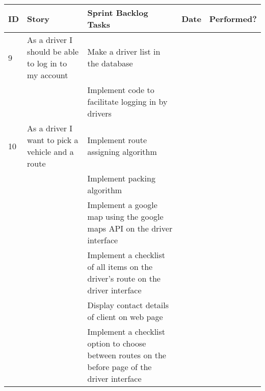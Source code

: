 \documentclass[paper=a4, fontsize=11pt]{scrartcl} %
\numberwithin{equation}{section} %
\numberwithin{figure}{section} %
\numberwithin{table}{section} %
\begin{document}
\begin{table}[]
\centering
\label{my-label}
\begin{tabular}{|p{1cm}|p{4cm}|p{4cm}|p{2cm}|p{2cm}|}
\hline
\textbf{ID} & \textbf{Story}                                                             & \textbf{Sprint Backlog Tasks}                                                                    & \textbf{Date} & \textbf{Performed?} \\ \hline
9           & As a driver I should be able to log in to my account                       & Make a driver list in the database                                                               &               &                     \\ \hline
            &                                                                            & Implement code to facilitate logging in by drivers                                               &               &                     \\ \hline
10          & As a driver I want to pick a vehicle and a route                           & Implement route assigning algorithm                                                              &               &                     \\ \hline
            &                                                                            & Implement packing algorithm                                                                      &               &                     \\ \hline
            &                                                                            & Implement a google map using the google maps API on the driver interface                         &               &                     \\ \hline
            &                                                                            & Implement a checklist of all items on  the driver's route on the driver interface                &               &                     \\ \hline
            &                                                                            & Display contact details of client on web page                                                    &               &                     \\ \hline
            &                                                                            & Implement a checklist option to choose between routes on the before page of the driver interface &               &                     \\ \hline

\end{tabular}
\end{table}
\end{document}
